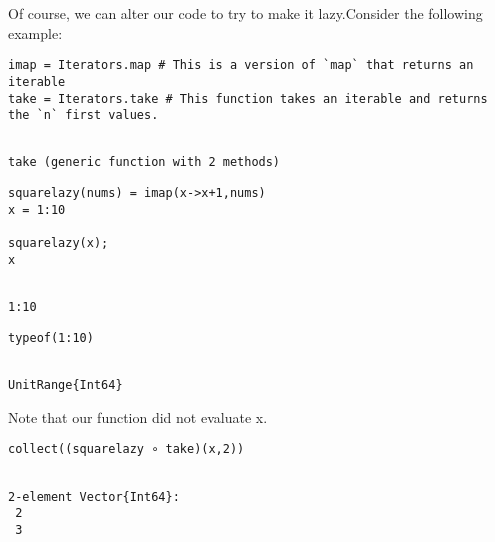 Of course, we can alter our code to try to make it lazy.Consider the following example:
\bigskip
\begin{lstlisting}[language=JuliaLocal, style=julia, texcl=true]
imap = Iterators.map # This is a version of `map` that returns an iterable
take = Iterators.take # This function takes an iterable and returns the `n` first values.
\end{lstlisting}

\begingroup

\fontsize{10pt}{12pt}\selectfont

\begin{verbatim}

take (generic function with 2 methods)
\end{verbatim}

\endgroup

\bigskip
\begin{lstlisting}[language=JuliaLocal, style=julia, texcl=true]
squarelazy(nums) = imap(x->x+1,nums)
x = 1:10

squarelazy(x);
x
\end{lstlisting}

\begingroup

\fontsize{10pt}{12pt}\selectfont

\begin{verbatim}

1:10
\end{verbatim}

\endgroup

\bigskip
\begin{lstlisting}[language=JuliaLocal, style=julia, texcl=true]
typeof(1:10)
\end{lstlisting}

\begingroup

\fontsize{10pt}{12pt}\selectfont

\begin{verbatim}

UnitRange{Int64}
\end{verbatim}

\endgroup
Note that our function did not evaluate x.
\bigskip
\begin{lstlisting}[language=JuliaLocal, style=julia, texcl=true]
collect((squarelazy ∘ take)(x,2))
\end{lstlisting}

\begingroup

\fontsize{10pt}{12pt}\selectfont

\begin{verbatim}

2-element Vector{Int64}:
 2
 3
\end{verbatim}

\endgroup
